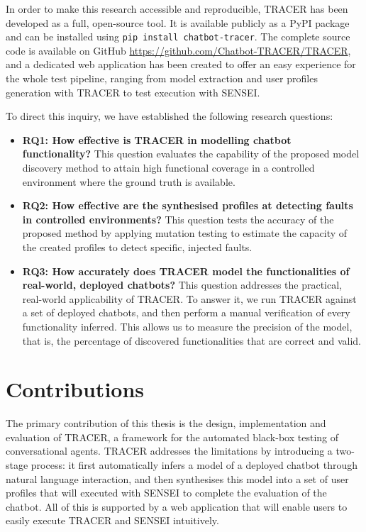 In order to make this research accessible and reproducible, \ac{TRACER} has been developed as a full, open-source tool.
It is available publicly as a \ac{PyPI} package \autocite{sotillodelhornoChatbottracerToolModel} and can be installed using \texttt{pip install chatbot-tracer}.
The complete source code is available on GitHub \url{https://github.com/Chatbot-TRACER/TRACER}, and a dedicated web application has been created to offer an easy experience for the whole test pipeline, ranging from model extraction and user profiles generation with \ac{TRACER} to test execution with SENSEI.


To direct this inquiry, we have established the following research questions:
\begin{itemize}
\item \textbf{RQ1: How effective is TRACER in modelling chatbot functionality?}
  This question evaluates the capability of the proposed model discovery method to attain high functional coverage in a controlled environment where the ground truth is available.
\item \textbf{RQ2: How effective are the synthesised profiles at detecting faults in controlled environments?}
  This question tests the accuracy of the proposed method by applying mutation testing \autocite{gomez-abajoMutationTestingTaskOriented2024} to estimate the capacity of the created profiles to detect specific, injected faults.
\item \textbf{RQ3: How accurately does TRACER model the functionalities of real-world, deployed chatbots?}
  This question addresses the practical, real-world applicability of \ac{TRACER}.
  To answer it, we run \ac{TRACER} against a set of deployed chatbots,
  and then perform a manual verification of every functionality inferred.
  This allows us to measure the precision of the model,
  that is, the percentage of discovered functionalities that are correct and valid.
\end{itemize}

\section{Contributions}

The primary contribution of this thesis is the design, implementation and evaluation of \acf{TRACER},
a framework for the automated black-box testing of conversational agents.
\ac{TRACER} addresses the limitations by introducing a two-stage process:
it first automatically infers a model of a deployed chatbot through natural language interaction,
and then synthesises this model into a set of user profiles
that will executed with SENSEI \autocite{delaraSensei} to complete the evaluation of the chatbot.
All of this is supported by a web application that will enable users to easily execute TRACER and SENSEI intuitively.

